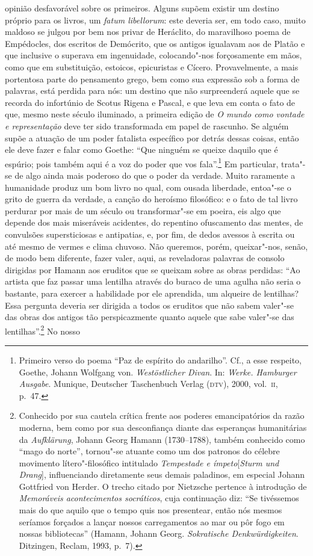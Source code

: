 opinião desfavorável sobre os primeiros. Alguns supõem existir um destino
próprio para os livros, um \textit{fatum libellorum}: este deveria ser, em
todo caso, muito maldoso se julgou por bem nos privar de Heráclito, do
maravilhoso poema de Empédocles, dos escritos de Demócrito, que os antigos
igualavam aos de Platão e que inclusive o superava em ingenuidade,
colocando"-nos forçosamente em mãos, como que em substituição, estoicos,
epicuristas e Cícero. Provavelmente, a mais portentosa parte do pensamento
grego, bem como sua expressão sob a forma de palavras, está perdida para nós:
um destino que não surpreenderá aquele que se recorda do infortúnio de Scotus
Rigena e Pascal, e que leva em conta o fato de que, mesmo neste século
iluminado, a primeira edição de \textit{O mundo como vontade e representação}
deve ter sido transformada em papel de rascunho. Se alguém supõe a atuação de
um poder fatalista específico por detrás dessas coisas, então ele deve fazer
e falar como Goethe: ``Que ninguém se queixe daquilo que é espúrio; pois
também aqui é a voz do poder que vos fala''.\footnote{Primeiro verso do
poema ``Paz de espírito do andarilho''. Cf., a esse respeito, Goethe, Johann
Wolfgang von. \textit{Westöstlicher Divan}. In: \textit{Werke. Hamburger
Ausgabe}. Munique, Deutscher Taschenbuch Verlag (\textsc{dtv}), 2000,
vol.~\textsc{ii}, p.~47.} Em particular, trata"-se de algo ainda mais
poderoso do que o poder da verdade. Muito raramente a humanidade produz um
bom livro no qual, com ousada liberdade, entoa"-se o grito de guerra da
verdade, a canção do heroísmo filosófico: e o fato de tal livro perdurar por
mais de um século ou transformar"-se em poeira, eis algo que depende dos mais
miseráveis acidentes, do repentino ofuscamento das mentes, de convulsões
supersticiosas e antipatias, e, por fim, de dedos avessos à escrita ou até
mesmo de vermes e clima chuvoso. Não queremos, porém, queixar"-nos, senão, de
modo bem diferente, fazer valer, aqui, as reveladoras palavras de consolo
dirigidas por Hamann aos eruditos que se queixam sobre as obras perdidas:
``Ao artista que faz passar uma lentilha através do buraco de uma agulha não
seria o bastante, para exercer a habilidade por ele aprendida, um alqueire de
lentilhas? Essa pergunta deveria ser dirigida a todos os eruditos que não
sabem valer"-se das obras dos antigos tão perspicazmente quanto aquele que
sabe valer"-se das lentilhas''.\footnote{Conhecido por sua cautela crítica
frente aos poderes emancipatórios da razão moderna, bem como por sua
desconfiança diante das esperanças humanitárias da \textit{Aufklärung}, 
Johann Georg Hamann (1730--1788), também conhecido como ``mago do norte'', 
tornou"-se atuante como um dos patronos do célebre movimento lítero"-filosófico 
intitulado \textit{Tempestade e ímpeto}[\textit{Sturm und Drang}], 
influenciando diretamente seus demais paladinos, em especial Johann 
Gottfried von Herder. O trecho citado por Nietzsche pertence
 à introdução de \textit{Memoráveis acontecimentos socráticos}, cuja
 continuação diz: ``Se tivéssemos mais do que aquilo que o tempo quis nos
 presentear, então nós mesmos seríamos forçados a lançar nossos carregamentos
 ao mar ou pôr fogo em nossas bibliotecas'' (Hamann, Johann Georg. 
 \textit{Sokratische Denkwürdigkeiten}. Ditzingen, Reclam, 1993, p.~7).} No nosso
